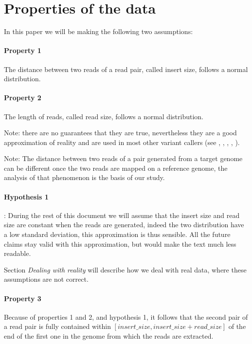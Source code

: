 \documentclass{article}
\begin{document}
\section{Properties of the data}

In this paper we will be making the following two assumptions:

\paragraph{Property 1} The distance between two reads of a read pair, called insert size, follows a normal distribution.
\paragraph{Property 2} The length of reads, called read size, follows a normal distribution.

Note: there are no guarantees that they are true, nevertheless they are a good approximation of reality and are used in most other variant callers (see \cite{ rausch_delly:_2012}, \cite{ye_pindel:_2009}, \cite{chen_manta:_2016}, \cite{handsaker_large_2015}, \cite{chen_breakdancer:_2009}).

Note: The distance between two reads of a pair generated from a target genome can be different once the two reads are mapped on a reference genome, the analysis of that phenomenon is the basis of our study.

\paragraph{Hypothesis 1}: During the rest of this document we will assume that the insert size and read size are constant when the reads are generated, indeed the two distribution have a low standard deviation, this approximation is thus sensible.
All the future claims stay valid with this approximation, but would make the text much less readable.

Section \emph{Dealing with reality} will describe how we deal with real data, where these assumptions are not correct.

\paragraph{Property 3} Because of properties 1 and 2, and hypothesis 1, it follows that the second pair of a read pair is fully contained within $[insert\_size, insert\_size + read\_size]$ of the end of the first one in the genome from which the reads are extracted.
\end{document}
